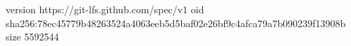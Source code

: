 version https://git-lfs.github.com/spec/v1
oid sha256:78ec45779b48263524a4063eeb5d5baf02e26bf9c4afca79a7b090239f13908b
size 5592544
